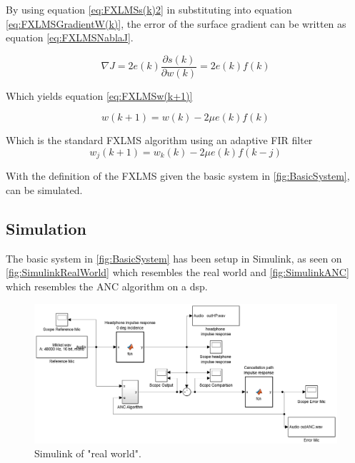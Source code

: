 By using equation \ref{eq:FXLMSs(k)2} in substituting into equation \ref{eq:FXLMSGradientW(k)}, the error of the surface gradient can be written as equation \ref{eq:FXLMSNablaJ}.

\begin{equation}\label{eq:FXLMSNablaJ}
\nabla J = 2e(k)\frac{\partial s(k)}{\partial w(k)} = 2e(k)f(k)
\end{equation}

Which yields equation \ref{eq:FXLMSw(k+1)}

\begin{equation}\label{eq:FXLMSw(k+1)}
w(k+1) = w(k) - 2\mu e(k)f(k)
\end{equation}

Which is the standard FXLMS algorithm using an adaptive FIR filter
\begin{equation}\label{eq:FXLMSw_j(k+1)}
w_j(k+1) = w_k(k) - 2\mu e(k)f(k-j)
\end{equation}

With the definition of the FXLMS given the basic system in \autoref{fig:BasicSystem}, can be simulated.







\subsection{Simulation} 
The basic system in \autoref{fig:BasicSystem} has been setup in Simulink, as seen on \autoref{fig:SimulinkRealWorld} which resembles the real world and \autoref{fig:SimulinkANC} which resembles the ANC algorithm on a dsp. 

\begin{figure}[H]
	\centering
	\includegraphics[width=1\textwidth]{figures/BasicSystem/SimulinkRealWorld}
	\caption{Simulink of "real world".}
	\label{fig:SimulinkRealWorld}
\end{figure}    

